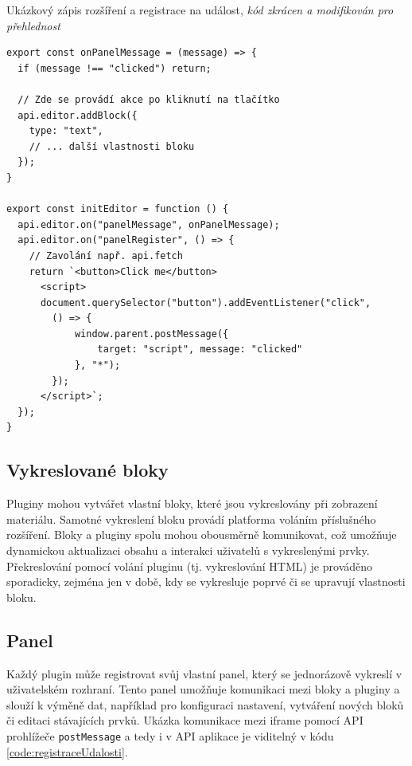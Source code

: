 \begin{listing}[ht!]
\caption[Ukázkový zápis rozšíření a registrace na událost]{Ukázkový zápis rozšíření a registrace na událost, \textit{kód zkrácen a modifikován pro přehlednost}}\label{code:registraceUdalosti}
\begin{verbatim}
export const onPanelMessage = (message) => {
  if (message !== "clicked") return;

  // Zde se provádí akce po kliknutí na tlačítko
  api.editor.addBlock({
    type: "text",
    // ... další vlastnosti bloku
  });
}

export const initEditor = function () {
  api.editor.on("panelMessage", onPanelMessage);
  api.editor.on("panelRegister", () => {
    // Zavolání např. api.fetch
    return `<button>Click me</button>
      <script>
      document.querySelector("button").addEventListener("click", 
        () => {
            window.parent.postMessage({
                target: "script", message: "clicked"
            }, "*");
        });
      </script>`;
  });
}
\end{verbatim}
\end{listing}


\subsection{Vykreslované bloky}

Pluginy mohou vytvářet vlastní bloky, které jsou vykreslovány při zobrazení materiálu. 
Samotné vykreslení bloku provádí platforma voláním příslušného rozšíření. 
Bloky a pluginy spolu mohou obousměrně komunikovat, což umožňuje dynamickou aktualizaci obsahu a interakci uživatelů s vykreslenými prvky.
Překreslování pomocí volání pluginu (tj. vykreslování HTML) je prováděno sporadicky, zejména jen v době, kdy se vykresluje poprvé či se upravují vlastnosti bloku.

\subsection{Panel}

Každý plugin může registrovat svůj vlastní panel, který se jednorázově vykreslí v uživatelském rozhraní. 
Tento panel umožňuje komunikaci mezi bloky a pluginy a slouží k výměně dat, například pro konfiguraci nastavení, vytváření nových bloků či editaci stávajících prvků. 
Ukázka komunikace mezi iframe pomocí API prohlížeče \texttt{postMessage} a tedy i v API aplikace je viditelný v kódu \ref{code:registraceUdalosti}.

